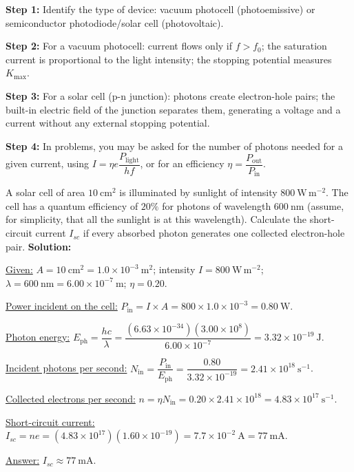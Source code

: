 \documentclass[11pt]{article}
\begin{document}
\begin{methode}
\textbf{Step 1:} Identify the type of device: vacuum photocell (photoemissive) or semiconductor photodiode/solar cell (photovoltaic).\par
\textbf{Step 2:} For a vacuum photocell: current flows only if $f > f_0$; the saturation current is proportional to the light intensity; the stopping potential measures $K_{\max}$.\par
\textbf{Step 3:} For a solar cell (p-n junction): photons create electron-hole pairs; the built-in electric field of the junction separates them, generating a voltage and a current without any external stopping potential.\par
\textbf{Step 4:} In problems, you may be asked for the number of photons needed for a given current, using $I = \eta e \dfrac{P_{\text{light}}}{hf}$, or for an efficiency $\eta = \dfrac{P_{\text{out}}}{P_{\text{in}}}$.
\end{methode}

\begin{exoresolu}
A solar cell of area $10\ \mathrm{cm}^2$ is illuminated by sunlight of intensity $800\ \mathrm{W\,m^{-2}}$. The cell has a quantum efficiency of $20\%$ for photons of wavelength $600\ \mathrm{nm}$ (assume, for simplicity, that all the sunlight is at this wavelength). Calculate the short-circuit current $I_{sc}$ if every absorbed photon generates one collected electron-hole pair.
\tcblower
\textbf{Solution:}\par
\underline{Given:} $A = 10\ \mathrm{cm}^2 = 1.0\times10^{-3}\ \mathrm{m}^2$; intensity $I = 800\ \mathrm{W\,m^{-2}}$; $\lambda = 600\ \mathrm{nm} = 6.00\times10^{-7}\ \mathrm{m}$; $\eta = 0.20$.\par
\underline{Power incident on the cell:} $P_{\text{in}} = I \times A = 800 \times 1.0\times10^{-3} = 0.80\ \mathrm{W}$.\par
\underline{Photon energy:} $E_{\text{ph}} = \dfrac{hc}{\lambda} = \dfrac{(6.63\times10^{-34})(3.00\times10^8)}{6.00\times10^{-7}} = 3.32\times10^{-19}\ \mathrm{J}$.\par
\underline{Incident photons per second:} $N_{\text{in}} = \dfrac{P_{\text{in}}}{E_{\text{ph}}} = \dfrac{0.80}{3.32\times10^{-19}} = 2.41\times10^{18}\ \mathrm{s^{-1}}$.\par
\underline{Collected electrons per second:} $n = \eta N_{\text{in}} = 0.20 \times 2.41\times10^{18} = 4.83\times10^{17}\ \mathrm{s^{-1}}$.\par
\underline{Short-circuit current:} $I_{sc} = n e = (4.83\times10^{17})(1.60\times10^{-19}) = 7.7\times10^{-2}\ \mathrm{A} = 77\ \mathrm{mA}$.\par
\underline{Answer:} $I_{sc} \approx 77\ \mathrm{mA}$.
\end{exoresolu}
\end{document}

